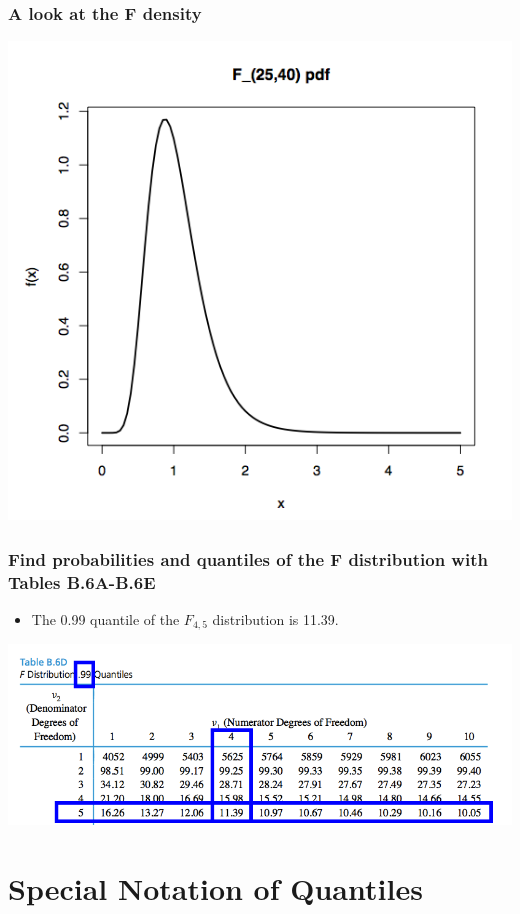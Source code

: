 \documentclass[handout]{beamer}\usepackage[]{graphicx}\usepackage[]{color}
\numberwithin{equation}{section}
\begin{document}
\begin{frame}
\frametitle{A look at the F density}
 \includegraphics{../../fig/fp3.png}
\end{frame}

\begin{frame}
\frametitle{Find probabilities and quantiles of the F distribution with Tables B.6A-B.6E}
\begin{itemize}
\item The 0.99 quantile of the $F_{4,5}$ distribution is 11.39.
\end{itemize}
\begin{center}
 \includegraphics{../../fig/fq.png}
\end{center}
\end{frame}

\section{Special Notation of Quantiles}
\end{document}
